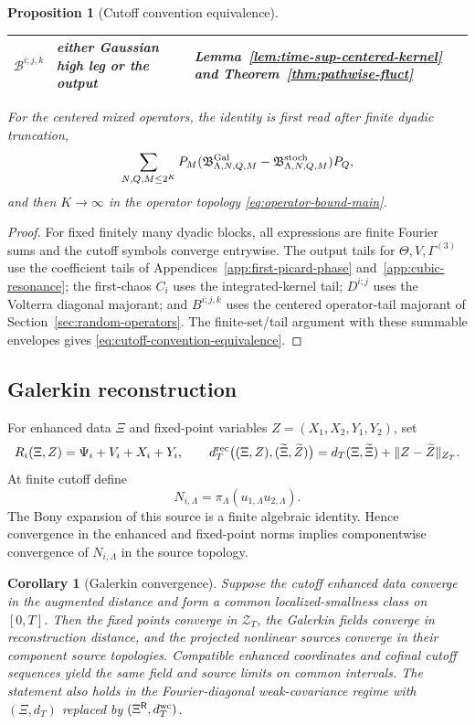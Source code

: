\documentclass[10pt]{amsart}
\numberwithin{equation}{section}
\theoremstyle{plain}
\newtheorem{proposition}[theorem]{Proposition}
\newtheorem{corollary}[theorem]{Corollary}
\theoremstyle{definition}
\theoremstyle{remark}
\begin{document}
\begin{proposition}[Cutoff convention equivalence]
\begin{center}
\begin{tabular}{@{}p{}p{}p{}@{}}
$\mathcal B^{i;j,k}$ & either Gaussian high leg or the output & Lemma~\ref{lem:time-sup-centered-kernel} and Theorem~\ref{thm:pathwise-fluct} \\
\bottomrule
\end{tabular}
\end{center}
For the centered mixed operators, the identity is first read after finite dyadic truncation,
\begin{equation}\label{eq:cutoff-diff-B-operator}
        \sum_{N,Q,M\le 2^K}P_M
        (\mathfrak B^{\rm Gal}_{\Lambda,N,Q,M}-\mathfrak B^{\rm stoch}_{\Lambda,N,Q,M})P_Q,
\end{equation}
and then $K\to\infty$ in the operator topology \eqref{eq:operator-bound-main}.
\end{proposition}

\begin{proof}
For fixed finitely many dyadic blocks, all expressions are finite Fourier sums and the cutoff symbols converge entrywise.  The output tails for $\Theta,V,\Gamma^{(3)}$ use the coefficient tails of Appendices~\ref{app:first-picard-phase} and~\ref{app:cubic-resonance}; the first-chaos $C_i$ uses the integrated-kernel tail; $D^{i;j}$ uses the Volterra diagonal majorant; and $B^{i;j,k}$ uses the centered operator-tail majorant of Section~\ref{sec:random-operators}.  The finite-set/tail argument with these summable envelopes gives \eqref{eq:cutoff-convention-equivalence}.
\end{proof}

\subsection{Galerkin reconstruction}\label{subsec:galerkin-source-limit}
For enhanced data \(\Xi\) and fixed-point variables \(Z=(X_1,X_2,Y_1,Y_2)\), set
\[
        R_i(\Xi,Z)=\Psi_i+V_i+X_i+Y_i,
        \qquad
        d_T^{\rm rec}\bigl((\Xi,Z),(\widetilde\Xi,\widetilde Z)\bigr)
        =d_T(\Xi,\widetilde\Xi)+\|Z-\widetilde Z\|_{Z_T}.
\]
At finite cutoff define
\[
        N_{i,\Lambda}=\pi_\Lambda(u_{1,\Lambda}u_{2,\Lambda}).
\]
The Bony expansion of this source is a finite algebraic identity.  Hence convergence in the enhanced and fixed-point norms implies componentwise convergence of \(N_{i,\Lambda}\) in the source topology.

\begin{corollary}[Galerkin convergence]\label{cor:cutoff-stability}
Suppose the cutoff enhanced data converge in the augmented distance and form a common localized-smallness class on \([0,T]\).  Then the fixed points converge in \(\mathcal Z_T\), the Galerkin fields converge in reconstruction distance, and the projected nonlinear sources converge in their component source topologies.  Compatible enhanced coordinates and cofinal cutoff sequences yield the same field and source limits on common intervals.  The statement also holds in the Fourier-diagonal weak-covariance regime with \((\Xi,d_T)\) replaced by \((\Xi^{\mathsf R},d_T^{\rm wc})\).
\end{corollary}
\end{document}
